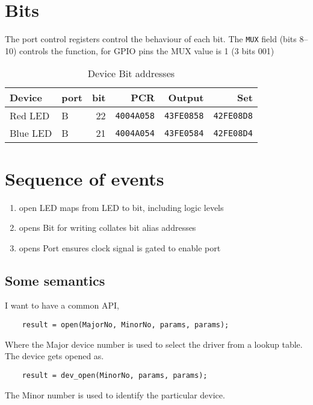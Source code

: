 \documentclass{tufte-handout}
\begin{document}
\section{Bits}
The port control registers control the behaviour of each bit.
The \texttt{MUX} field (bits 8--10) controls the function, for GPIO pins the MUX value is 1 (3 bits 001)

\begin{table}
    \caption{Device Bit addresses}
    \label{}
    \begin{tabular}{llrrrr}
        Device & port & bit & PCR & Output & Set \\ \midrule
Red LED & B & 22 & \texttt{4004A058} &
                           \texttt{43FE0858} & \texttt{42FE08D8} \\
Blue LED & B & 21 & \texttt{4004A054} &
                           \texttt{43FE0584} & \texttt{42FE08D4}
    \end{tabular}
\end{table}

\section{Sequence of events}
\begin{enumerate}
    \item open LED \hfill maps from LED to bit, including logic levels
    \item opens Bit for writing \hfill collates bit alias addresses
    \item opens Port  \hfill ensures clock signal is gated to enable port
\end{enumerate}

\subsection{Some semantics}
I want to have a common API,
\begin{tcolorbox}
\begin{verbatim}
    result = open(MajorNo, MinorNo, params, params);
\end{verbatim}
\end{tcolorbox}
Where the Major device number is used to select the driver from a lookup table.
The device gets opened as.
\begin{tcolorbox}
\begin{verbatim}
    result = dev_open(MinorNo, params, params);
\end{verbatim}
\end{tcolorbox}
The Minor number is used to identify the particular device.
\end{document}

